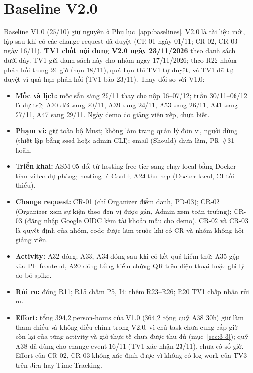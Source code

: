 \section{Baseline V2.0}
\label{sec:3-7}
Baseline V1.0 (25/10) giữ nguyên ở Phụ lục~\ref{app:baselines}. V2.0 là tài liệu mới, lập sau khi có các change request đã duyệt (CR-01 ngày 01/11; CR-02, CR-03 ngày 16/11). \textbf{TV1 chốt nội dung V2.0 ngày 23/11/2026} theo danh sách dưới đây. TV1 gửi danh sách này cho nhóm ngày 17/11/2026; theo R22 nhóm phản hồi trong 24 giờ (hạn 18/11), quá hạn thì TV1 tự duyệt, và TV1 đã tự duyệt vì quá hạn phản hồi (TV1 báo 23/11). Thay đổi so với V1.0:
\begin{itemize}
  \item \textbf{Mốc và lịch:} mốc sẵn sàng 29/11 thay cho nộp 06--07/12; tuần 30/11--06/12 là dự trữ; A30 dời sang 20/11, A39 sang 24/11, A53 sang 26/11, A41 sang 27/11, A47 sang 29/11. Ngày demo do giảng viên xếp, chưa biết.
  \item \textbf{Phạm vi:} giữ toàn bộ Must; không làm trang quản lý đơn vị, người dùng (thiết lập bằng seed hoặc admin CLI); email (Should) chưa làm, PR \#31 hoãn.
  \item \textbf{Triển khai:} ASM-05 đổi từ hosting free-tier sang chạy local bằng Docker kèm video dự phòng; hosting là Could; A24 thu hẹp (Docker local, CI tối thiểu).
  \item \textbf{Change request:} CR-01 (chỉ Organizer điểm danh, PD-03); CR-02 (Organizer xem sự kiện theo đơn vị được gán, Admin xem toàn trường); CR-03 (đăng nhập Google OIDC kèm tài khoản mẫu cho demo). CR-02 và CR-03 là quyết định của nhóm, code được làm trước khi có CR và nhóm không hỏi giảng viên.
  \item \textbf{Activity:} A32 đóng; A33, A34 đóng sau khi có kết quả kiểm thử; A35 gộp vào PR frontend; A20 đóng bằng kiểm chứng QR trên điện thoại hoặc ghi lý do bỏ spike.
  \item \textbf{Rủi ro:} đóng R11; R15 chấm P5, I4; thêm R23--R26; R20 TV1 chấp nhận rủi ro.
  \item \textbf{Effort:} tổng 394,2 person-hours của V1.0 (364,2 cộng quỹ A38 30h) giữ làm tham chiếu và không điều chỉnh trong V2.0, vì chủ task chưa cung cấp giờ còn lại của từng activity và giờ thực tế chưa được thu đủ (mục~\ref{sec:3-3}); quỹ A38 đã dùng cho change event 16/11 (TV1 xác nhận 23/11), chưa có số giờ. Effort của CR-02, CR-03 không xác định được vì không có log work của TV3 trên Jira hay Time Tracking.
\end{itemize}

